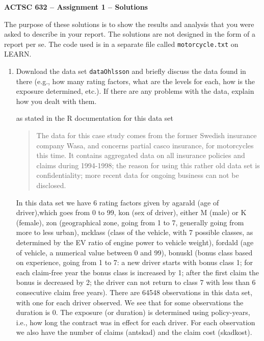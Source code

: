 \documentclass[11pt]{article}
\begin{document}
\begin{center}
{\large \bf ACTSC 632 -- Assignment 1 -- Solutions} \\

\end{center}

The purpose of these solutions is to show the results and analysis that you were asked to describe in your report. The solutions are not designed in the form of a report per se. The code used is in a separate file called {\tt motorcycle.txt} on LEARN.



\begin{enumerate}
  
\item Download the data set {\tt dataOhlsson} and briefly discuss the data found in there (e.g., how many rating factors, what are the levels for each, how is the exposure determined, etc.). If there are any problems with the data, explain how you dealt with them. 

 as stated in the R documentation for this data set

\begin{quote}
The data for this case study comes from the former Swedish insurance company Wasa, and concerns partial casco insurance, for motorcycles this time. It contains aggregated data on all insurance policies and claims during 1994-1998; the reason for using this rather old data set is confidentiality; more recent data for ongoing business can not be disclosed.
\end{quote}

In this data set we have 6 rating factors given by agarald (age of driver),which goes from 0 to 99, kon (sex of driver), either M (male) or K (female), zon (geographical zone, going from 1 to 7, generally going from more to less urban), mcklass (class of the vehicle, with 7 possible classes, as determined by the EV ratio of engine power to vehicle weight), fordald (age of vehicle, a numerical value between 0 and 99), bonuskl (bonus class based on experience, going from 1 to 7: a new driver starts with bonus class 1; for each claim-free year the bonus class is increased by 1; after the first claim the bonus is decreased by 2; the driver can not return to class 7 with less than 6 consecutive claim free years). There are 64548 observations in this data set, with one for each driver observed. We see that for some observations the duration is 0. The exposure (or duration) is determined using policy-years, i.e., how long the contract was in effect for each driver.
For each observation we also have the number of claims (antskad) and the claim cost (skadkost).



\end{enumerate}
\end{document}
